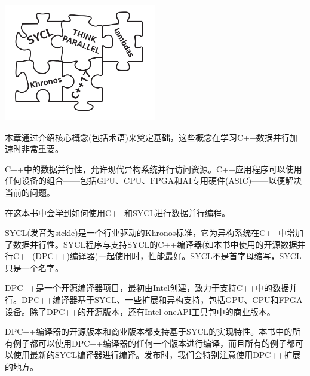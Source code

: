 \begin{center}
	\includegraphics[width=0.5\textwidth]{content/chapter-1/images/1}
\end{center}

本章通过介绍核心概念(包括术语)来奠定基础，这些概念在学习C++数据并行加速时非常重要。\par

C++中的数据并行性，允许现代异构系统并行访问资源。C++应用程序可以使用任何设备的组合——包括GPU、CPU、FPGA和AI专用硬件(ASIC)——以便解决当前的问题。\par

在这本书中会学到如何使用C++和SYCL进行数据并行编程。\par

SYCL(发音为sickle)是一个行业驱动的Khronos标准，它为异构系统在C++中增加了数据并行性。SYCL程序与支持SYCL的C++编译器(如本书中使用的开源数据并行C++(DPC++)编译器)一起使用时，性能最好。SYCL不是首字母缩写，SYCL只是一个名字。\par

DPC++是一个开源编译器项目，最初由Intel创建，致力于支持C++中的数据并行。DPC++编译器基于SYCL、一些扩展和异构支持，包括GPU、CPU和FPGA设备。除了DPC++的开源版本，还有Intel oneAPI工具包中的商业版本。\par

DPC++编译器的开源版本和商业版本都支持基于SYCL的实现特性。本书中的所有例子都可以使用DPC++编译器的任何一个版本进行编译，而且所有的例子都可以使用最新的SYCL编译器进行编译。发布时，我们会特别注意使用DPC++扩展的地方。\par

